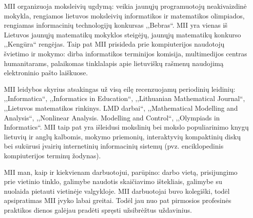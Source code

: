 MII organizuoja moksleivių ugdymą: veikia jaunųjų programuotojų neakivaizdinė mokykla, rengiamos lietuvos moksleivių informatikos ir matematikos olimpiados, rengiamas informacinių technologijų konkursas ,,Bebras``. MII yra vienas iš Lietuvos jaunųjų matematikų mokyklos steigėjų, jaunųjų matematikų konkurso ,,Kengūra`` rengėjas. Taip pat MII prisideda prie kompiuterijos naudotojų švietimo ir mokymo: dirba informatikos terminijos komisija, multimedijos centras humanitarams, palaikomas tinklalapis apie lietuviškų rašmenų naudojimą elektroninio pašto laiškuose.

MII leidybos skyrius atsakingas už visą eilę recenzuojamų periodinių leidinių: ,,Informatica``, ,,Informatics in Education``, ,,Lithuanian Mathematical Journal``, ,,Lietuvos matematikos rinkinys. LMD darbai``, ,,Mathematical Modelling and Analysis``, ,,Nonlinear Analysis. Modelling and Control``, ,,Olympiads in Informatics``. MII taip pat yra išleidusi mokslinių bei mokslo populiarinimo knygų lietuvių ir anglų kalbomis, mokymo priemonių, interaktyvių kompaktinių diskų bei sukūrusi įvairių internetinių informacinių sistemų (pvz. enciklopedinis kompiuterijos terminų žodynas).

MII man, kaip ir kiekvienam darbuotojui, parūpino: darbo vietą, prisijungimo prie vietinio tinklo, galimybe naudotis skaičiavimo ištekliais, galimybe su nuolaida pietauti vietinėje valgykloje. MII darbuotojai buvo kolegiški, todėl apsipratimas MII įvyko labai greitai. Todėl jau nuo pat pirmosios profesinės praktikos dienos galėjau pradėti spręsti užsibrėžtus uždavinius.
